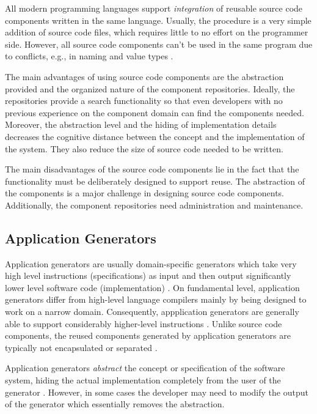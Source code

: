 All modern programming languages support \emph{integration} of reusable source code components written in the same language. Usually, the procedure is a very simple addition of source code files, which requires little to no effort on the programmer side. However, all source code components can't be used in the same program due to conflicts, e.g., in naming and value types \citep[chap.~5]{krueger_software_1992}.

The main advantages of using source code components are the abstraction provided and the organized nature of the component repositories. Ideally, the repositories provide a search functionality so that even developers with no previous experience on the component domain can find the components needed. Moreover, the abstraction level and the hiding of implementation details decreases the cognitive distance between the concept and the implementation of the system. They also reduce the size of source code needed to be written.

The main disadvantages of the source code components lie in the fact that the functionality must be deliberately designed to support reuse. The abstraction of the components is a major challenge \citep[chap.~5]{krueger_software_1992} in designing source code components. Additionally, the component repositories need administration and maintenance.

\subsection{Application Generators}

Application generators are usually domain-specific generators which take very high level instructions (specifications) as input and then output significantly lower level software code (implementation) \citep[chap.~7]{cleaveland_building_1988,krueger_software_1992}. On fundamental level, application generators differ from high-level language compilers mainly by being designed to work on a narrow domain. Consequently, appplication generators are generally able to support considerably higher-level instructions \citep[chap.~7]{krueger_software_1992}. Unlike source code components, the reused components generated by application generators are typically not encapsulated or separated \citep[chap.~3]{sametinger_software_1997}.

Application generators \emph{abstract} the concept or specification of the software system, hiding the actual implementation completely from the user of the generator \citep{cleaveland_building_1988}. However, in some cases the developer may need to modify the output of the generator which essentially removes the abstraction.

